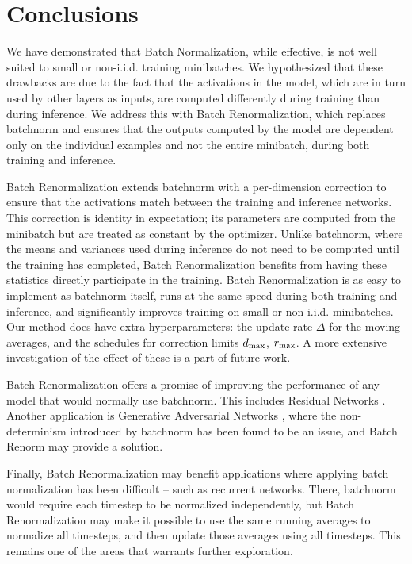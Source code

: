 \section{Conclusions}

We have demonstrated that Batch Normalization, while effective, is not well suited to small or non-i.i.d. training minibatches. We hypothesized that these drawbacks are due to the fact that the activations in the model, which are in turn used by other layers as inputs, are computed differently during training than during inference. We address this with Batch Renormalization, which replaces batchnorm and ensures that the outputs computed by the model are dependent only on the individual examples and not the entire minibatch, during both training and inference.

Batch Renormalization extends batchnorm with a per-dimension correction to ensure that the activations match between the training and inference networks. This correction is identity in expectation; its parameters are computed from the minibatch but are treated as constant by the optimizer. Unlike batchnorm, where the means and variances used during inference do not need to be computed until the training has completed, Batch Renormalization benefits from having these statistics directly participate in the training. Batch Renormalization is as easy to implement as batchnorm itself, runs at the same speed during both training and inference, and significantly improves training on small or non-i.i.d. minibatches. Our method does have extra hyperparameters: the update rate $\Delta$ for the moving averages, and the schedules for correction limits $d_{\text{max}}$, $r_{\text{max}}$. A more extensive investigation of the effect of these is a part of future work.

Batch Renormalization offers a promise of improving the performance of any model that would normally use batchnorm. This includes Residual Networks \cite{resnet}. Another application is Generative Adversarial Networks \cite{gan}, where the non-determinism introduced by batchnorm has been found to be an issue, and Batch Renorm may provide a solution.

Finally, Batch Renormalization may benefit applications where applying batch normalization has been difficult -- such as recurrent networks. There, batchnorm would require each timestep to be normalized independently, but Batch Renormalization may make it possible to use the same running averages to normalize all timesteps, and then update those averages using all timesteps. This remains one of the areas that warrants further exploration.

